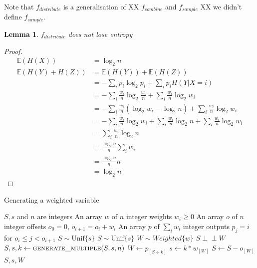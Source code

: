 \documentclass[12pt]{article}
\newtheorem{lemma}{Lemma}
\newcommand{\indep}{\perp\!\!\!\perp}
\newcommand{\unif}[1]{\mathrm{Unif}\{#1\}}
\begin{document}
Note that $f_{distribute}$ is a generalisation of XX $f_{combine}$ and $f_{sample}$ XX we didn't define $f_{sample}$.

\begin{lemma}
    \label{lem:distribution-conservation}
    $f_{distribute}$ does not lose entropy
\end{lemma}

\begin{proof}
    \begin{align}
    \mathbb{E}(H(X)) & = \log_2 n \\
    \mathbb{E}(H(Y) + H(Z)) &=  \mathbb{E}(H(Y)) + \mathbb{E}(H(Z)) \\
               & = - \sum_i p_i \log_2p_i + \sum_i p_iH(Y|X=i) \\
               & = - \sum_i \frac{w_i}{n} \log_2 \frac{w_i}{n} + \sum_i \frac{w_i}{n}\log_2 w_i \\
               & = - \sum_i \frac{w_i}{n}(\log_2 w_i - \log_2 n) + \sum_i \frac{w_i}{n}\log_2 w_i \\
               & = - \sum_i \frac{w_i}{n}\log_2 w_i + \sum_i \frac{w_i}{n} \log_2 n + \sum_i \frac{w_i}{n}\log_2 w_i \\
               & = \sum_i \frac{w_i}{n} \log_2 n \\
               & = \frac{\log_2 n}{n} \sum_i w_i \\
               & = \frac{\log_2 n}{n} n \\
               & = \log_2 n
    \end{align}
\end{proof}

\begin{algorithm}
\caption{Generating a weighted variable}
\label{alg:generate-weighted}
\begin{algorithmic}[1]
\Require $S, s$ and $n$ are integers
\Require An array $w$ of $n$ integer weights $w_i \ge 0$
\Require An array $o$ of $n$ integer offsets $o_0 = 0$, $o_{i+1} = o_i + w_i$
\Require An array $p$ of $\sum_i w_i$ integer outputs $p_j = i$ for $o_i \le j < o_{i+1}$
\Require $S \sim \unif{s}$
\Ensure $S \sim \unif{s}$
\Ensure $W \sim Weighted\{w\}$
\Ensure $S \indep W$
    \State $S, s, k \gets \textsc{generate\_multiple}(S, s, n)$
    \State $W \gets p_{[S \div k]}$
    \State $s \gets k * w_{[W]}$
    \State $S \gets S - o_{[W]}$ 
    \State \Return $S, s, W$
\EndProcedure
\end{algorithmic}
\end{algorithm}
\end{document}
